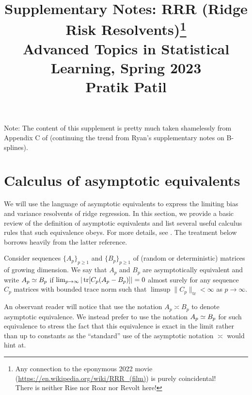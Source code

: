 \documentclass{article}
\title{Supplementary Notes: RRR (Ridge Risk Resolvents)\footnote{Any connection 
to the eponymous 2022 movie (\url{https://en.wikipedia.org/wiki/RRR_(film)}) 
is purely coincidental!\\There is neither Rise nor Roar nor Revolt here! } \\ \smallskip
\large Advanced Topics in Statistical Learning, Spring 2023 \\ \smallskip
Pratik Patil}
\author{}
\date{}
\begin{document}
\maketitle
\RaggedRight
\vspace{-50pt}

Note: The content of this supplement is pretty much taken shamelessly 
from Appendix C of \cite{patil_2022}
(continuing the trend from Ryan's supplementary notes on B-splines).

\section{Calculus of asymptotic equivalents}
\label{sec:calculus_deterministic_equivalents}

We will use the language of asymptotic equivalents
to express the limiting bias and variance resolvents of ridge regression.
In this section, we provide a basic review of the definition
of asymptotic equivalents and list several useful calculus rules
that such equivalence obeys.
For more details, see \cite{dobriban_sheng_2021, patil_2022}.
The treatment below borrows heavily from the latter reference.


\begin{definition}
    \label{def:deterministic-equivalence}
    Consider sequences $\{ A_p \}_{p \ge 1}$ and $\{ B_p \}_{p \ge 1}$
    of (random or deterministic) matrices of growing dimension.
    We say that $A_p$ and $B_p$ are asymptotically equivalent and write
    $A_p \simeq B_p$ if
    $\lim_{p \to \infty} | \operatorname{tr}[C_p (A_p - B_p)] | = 0$ almost surely
    for any sequence $C_p$ matrices with bounded trace norm
    such that $\limsup \| C_p \|_{\mathrm{tr}} < \infty$
    as $p \to \infty$.
\end{definition}

An observant reader will notice that
\cite{dobriban_sheng_2021}
use the notation $A_p \asymp B_p$
to denote asymptotic equivalence.
We instead prefer to use the notation
$A_p \simeq B_p$ for such equivalence
to stress the fact that this equivalence
is exact in the limit rather than up to constants
as the ``standard'' use of the asymptotic notation
$\asymp$ would hint at.
\end{document}
